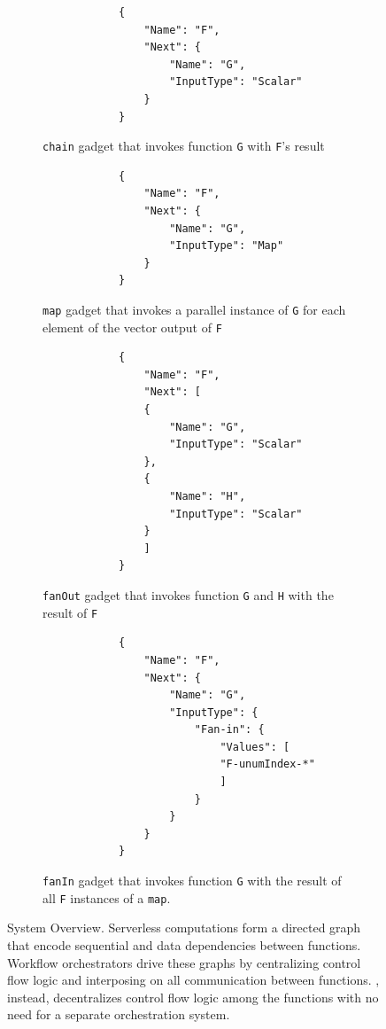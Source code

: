 \begin{figure}[t!]
	\centering
	\begin{subfigure}[t]{\columnwidth}
		\centering
		\begin{verbatim}
			{
				"Name": "F",
				"Next": {
					"Name": "G",
					"InputType": "Scalar"
				}
			}
		\end{verbatim}
		\caption{\texttt{chain} gadget that invokes function \texttt{G} with
			\texttt{F}'s result}
		\label{fig:gadget-examples-chain}
	\end{subfigure}
	\begin{subfigure}[t]{\columnwidth}
		\centering
		\begin{verbatim}
			{
				"Name": "F",
				"Next": {
					"Name": "G",
					"InputType": "Map"
				}
			}
		\end{verbatim}
		\caption{\texttt{map} gadget that invokes a parallel instance of
			\texttt{G} for each element of the vector output of \texttt{F}}
		\label{fig:gadget-examples-map}
	\end{subfigure}
	\hfill
	\begin{subfigure}[t]{\columnwidth}
		\centering
		\begin{verbatim}
			{
				"Name": "F",
				"Next": [
				{
					"Name": "G",
					"InputType": "Scalar"
				},
				{
					"Name": "H",
					"InputType": "Scalar"
				}
				]
			}
		\end{verbatim}
		\caption{\texttt{fanOut} gadget that invokes function \texttt{G} and
			\texttt{H} with the result of \texttt{F}}
		\label{fig:gadget-examples-fanout}
	\end{subfigure}
	\begin{subfigure}[t]{\columnwidth}
		\centering
		\begin{verbatim}
			{
				"Name": "F",
				"Next": {
					"Name": "G",
					"InputType": {
						"Fan-in": {
							"Values": [
							"F-unumIndex-*"
							]
						}
					}
				}
			}
		\end{verbatim}
		\caption{\texttt{fanIn} gadget that invokes function \texttt{G} with
			the result of all \texttt{F} instances of a \texttt{map}.}
		\label{fig:gadget-examples-fanin}
	\end{subfigure}
	\caption{\name{} System Overview. Serverless computations form a directed
		graph that encode sequential and data dependencies between functions. Workflow
		orchestrators drive these graphs by centralizing control flow logic and
		interposing on all communication between functions. \name{},
		instead, decentralizes control flow logic among the functions with
		no need for a separate orchestration system.}
	\label{fig:arch2}
\end{figure}

